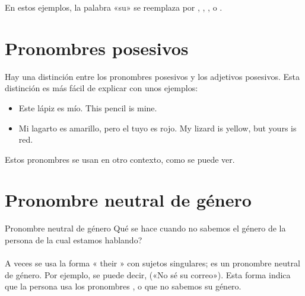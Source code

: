 En estos ejemplos, la palabra «su» se reemplaza
por , , , o .

\section{Pronombres posesivos}

Hay una distinci\'on entre los pronombres posesivos y los adjetivos posesivos.
Esta distinci\'on es m\'as f\'acil de explicar con unos ejemplos:

\begin{itemize}
	\item Este l\'apiz es m\'io.
		\arr This pencil is mine.
	\item Mi lagarto es amarillo, pero el tuyo es rojo.
		\arr My lizard is yellow, but yours is red.
\end{itemize}

Estos pronombres se usan en otro contexto, como se puede ver.

\section{Pronombre neutral de g\'enero}
\begin{conf}{Pronombre neutral de g\'enero}
\textquestiondown Qu\'e se hace cuando no sabemos el g\'enero de la persona de
la cual estamos hablando? \\
\\
A veces se usa la forma « their » con sujetos singulares; es un pronombre neutral
de g\'enero.
Por ejemplo, se puede decir,  («No sé su correo»).
Esta forma indica que la persona usa los pronombres , o que
no sabemos su g\'enero.
\end{conf}


